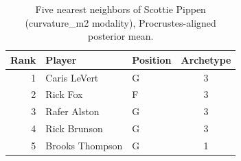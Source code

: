 \begin{table}[htbp]
  \centering\small
  \begin{tabular}{rllc}
    \toprule
    Rank & Player & Position & Archetype \\
    \midrule
    1 & Caris LeVert & G & 3 \\
    2 & Rick Fox & F & 3 \\
    3 & Rafer Alston & G & 3 \\
    4 & Rick Brunson & G & 3 \\
    5 & Brooks Thompson & G & 1 \\
    \bottomrule
  \end{tabular}
  \caption{Five nearest neighbors of Scottie Pippen (curvature_m2 modality), Procrustes-aligned posterior mean.}
  \label{tab:Scottie_Pippen_neighbors_curvature_m2}
\end{table}

